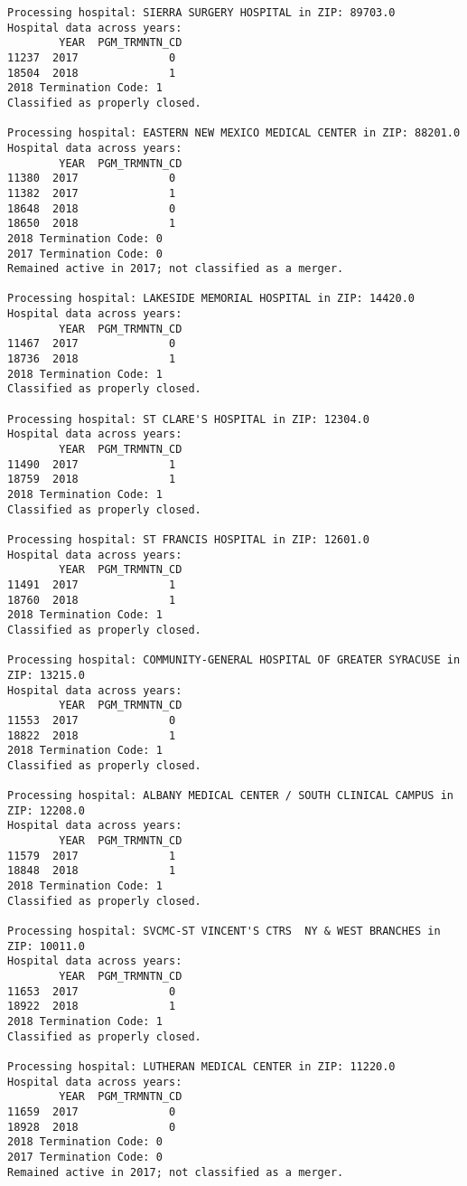 \documentclass[
  letterpaper,
  DIV=11,
  numbers=noendperiod]{scrartcl}
\begin{document}
\begin{verbatim}
Processing hospital: SIERRA SURGERY HOSPITAL in ZIP: 89703.0
Hospital data across years:
        YEAR  PGM_TRMNTN_CD
11237  2017              0
18504  2018              1
2018 Termination Code: 1
Classified as properly closed.

Processing hospital: EASTERN NEW MEXICO MEDICAL CENTER in ZIP: 88201.0
Hospital data across years:
        YEAR  PGM_TRMNTN_CD
11380  2017              0
11382  2017              1
18648  2018              0
18650  2018              1
2018 Termination Code: 0
2017 Termination Code: 0
Remained active in 2017; not classified as a merger.

Processing hospital: LAKESIDE MEMORIAL HOSPITAL in ZIP: 14420.0
Hospital data across years:
        YEAR  PGM_TRMNTN_CD
11467  2017              0
18736  2018              1
2018 Termination Code: 1
Classified as properly closed.

Processing hospital: ST CLARE'S HOSPITAL in ZIP: 12304.0
Hospital data across years:
        YEAR  PGM_TRMNTN_CD
11490  2017              1
18759  2018              1
2018 Termination Code: 1
Classified as properly closed.

Processing hospital: ST FRANCIS HOSPITAL in ZIP: 12601.0
Hospital data across years:
        YEAR  PGM_TRMNTN_CD
11491  2017              1
18760  2018              1
2018 Termination Code: 1
Classified as properly closed.

Processing hospital: COMMUNITY-GENERAL HOSPITAL OF GREATER SYRACUSE in ZIP: 13215.0
Hospital data across years:
        YEAR  PGM_TRMNTN_CD
11553  2017              0
18822  2018              1
2018 Termination Code: 1
Classified as properly closed.

Processing hospital: ALBANY MEDICAL CENTER / SOUTH CLINICAL CAMPUS in ZIP: 12208.0
Hospital data across years:
        YEAR  PGM_TRMNTN_CD
11579  2017              1
18848  2018              1
2018 Termination Code: 1
Classified as properly closed.

Processing hospital: SVCMC-ST VINCENT'S CTRS  NY & WEST BRANCHES in ZIP: 10011.0
Hospital data across years:
        YEAR  PGM_TRMNTN_CD
11653  2017              0
18922  2018              1
2018 Termination Code: 1
Classified as properly closed.

Processing hospital: LUTHERAN MEDICAL CENTER in ZIP: 11220.0
Hospital data across years:
        YEAR  PGM_TRMNTN_CD
11659  2017              0
18928  2018              0
2018 Termination Code: 0
2017 Termination Code: 0
Remained active in 2017; not classified as a merger.


\end{verbatim}
\end{document}
